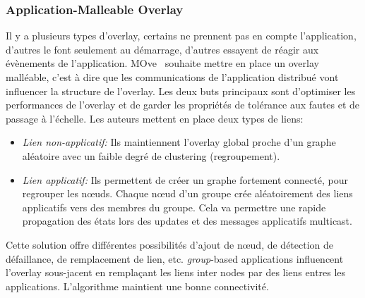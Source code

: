 		\subsubsection{Application-Malleable Overlay}
			Il y a plusieurs types d'overlay, certains ne prennent pas en compte l'application, d'autres le font seulement au démarrage, d'autres essayent de réagir aux évènements de l'application. MOve~\cite{10.1109/SRDS.2006.33} souhaite mettre en place un overlay malléable, c'est à dire que les communications de l'application distribué vont influencer la structure de l'overlay. Les deux buts principaux sont d'optimiser les performances de l'overlay et de garder les propriétés de tolérance aux fautes et de passage à l'échelle. Les auteurs mettent en place deux types de liens:
		\begin{itemize}
	        \renewcommand{\labelitemi}{$\bullet$}
	                \item \textit{Lien non-applicatif:} Ils maintiennent l'overlay global proche d'un graphe aléatoire avec un faible degré de clustering (regroupement).
        	        \item \textit{Lien applicatif:} Ils  permettent de créer un graphe fortement connecté, pour regrouper les nœuds. Chaque nœud d'un groupe crée aléatoirement des liens applicatifs vers des membres du groupe. Cela va permettre une rapide propagation des états lors des updates et des messages applicatifs multicast.
        	\end{itemize}
        Cette solution offre différentes possibilités d'ajout de nœud, de détection de défaillance, de remplacement de lien, etc. \textit{group}-based applications influencent l'overlay sous-jacent en remplaçant les liens inter nodes par des liens entres les applications. L'algorithme maintient une bonne connectivité.
